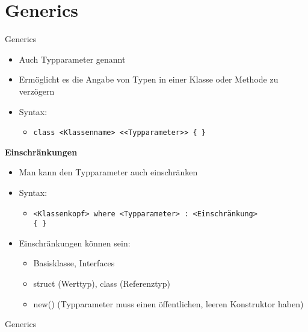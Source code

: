 \section{Generics}
\begin{frame}{Generics}
	\begin{itemize}
		\item Auch Typparameter genannt
		\item Ermöglicht es die Angabe von Typen in einer Klasse oder Methode zu verzögern
		\item Syntax:
		\begin{itemize}
			\item \texttt{class \alert{<Klassenname>} <\alert{<Typparameter>}> \{ \}}
		\end{itemize}
	\end{itemize}
	\textbf{Einschränkungen}\\
	\begin{itemize}
		\item Man kann den Typparameter auch einschränken
		\item Syntax:
		\begin{itemize}
			\item \texttt{\alert{<Klassenkopf>} where \alert{<Typparameter>} : \alert{<Einschränkung>}\\ \{ \}}
		\end{itemize}
		\item Einschränkungen können sein:
		\begin{itemize}
			\item Basisklasse, Interfaces
			\item \alert{struct} (Werttyp), \alert{class} (Referenztyp)
			\item \alert{new()} (Typparameter muss einen öffentlichen, leeren Konstruktor haben)
		\end{itemize}
	\end{itemize}
\end{frame}

\begin{frame}{Generics}
	
	
\end{frame}

